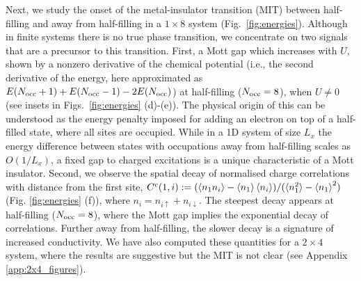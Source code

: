 \documentclass[aps,prb,twoside,superscriptaddress,longbibliography,nofootinbib,floatfix, notitlepage,twocolumn]{revtex4-1}
\newcommand{\Nocc}{N_{\rm{occ}}}
\begin{document}
Next, we study the onset of the metal-insulator transition (MIT) \cite{Imada1998} between half-filling and away from half-filling in a $1\times 8$ system (Fig.~\ref{fig:energies}). Although in finite systems there is no true phase transition, we concentrate on two signals that are a precursor to this transition. First, a Mott gap which increases with $U$, shown by a nonzero derivative of the chemical potential (i.e., the second derivative of the energy, here approximated as $E(\Nocc+1)+E(\Nocc-1)-2E(\Nocc)$) at half-filling ($\Nocc=8$), when $U\neq0$ (see insets in Figs.~\ref{fig:energies} (d)-(e)). The physical origin of this can be understood as the energy penalty imposed for adding an electron on top of a half-filled state, where all sites are occupied. While in a 1D system of size $L_x$ the energy difference between states with occupations away from half-filling scales as $O(1/L_x)$, a fixed gap to charged excitations is a unique characteristic of a Mott insulator.
Second, we observe the spatial decay of normalised charge correlations with distance from the first site, $C^c(1,i) := (\braket{n_1 n_i} - \braket{n_1}\braket{n_i}) / (\braket{n_1^2} - \braket{n_1}^2)$ (Fig. \ref{fig:energies} (f)), where $n_i=n_{i\uparrow}+n_{i\downarrow}$. The steepest decay appears at half-filling ($\Nocc=8$), where the Mott gap implies the exponential decay of correlations. Further away from half-filling, the slower decay is a signature of increased conductivity. We have also computed these quantities for a $2\times 4$ system, where the results are suggestive but the MIT is not clear (see Appendix \ref{app:2x4_figures}).
\end{document}
